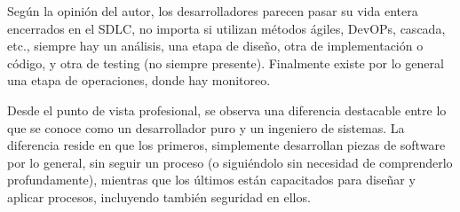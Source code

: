Según la opinión del autor, los desarrolladores parecen pasar su vida entera encerrados en el SDLC, no importa si utilizan métodos ágiles, DevOPs, cascada, etc., siempre hay un análisis, una etapa de diseño, otra de implementación o código, y otra de testing (no siempre presente). Finalmente existe por lo general una etapa de operaciones, donde hay monitoreo.

Desde el punto de vista profesional, se observa una diferencia destacable entre lo que se conoce como un desarrollador puro y un ingeniero de sistemas. La diferencia reside en que los primeros, simplemente desarrollan piezas de software por lo general, sin seguir un proceso (o siguiéndolo sin necesidad de comprenderlo profundamente), mientras que los últimos están capacitados para diseñar y aplicar procesos, incluyendo también seguridad en ellos.

